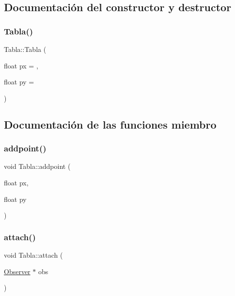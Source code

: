 \subsection{Documentación del constructor y destructor}
\mbox{\label{class_tabla_a30892e5df0e41e88871809298362bbc4}} 
\subsubsection{\texorpdfstring{Tabla()}{Tabla()}}
{\footnotesize\ttfamily Tabla\+::\+Tabla (\begin{DoxyParamCaption}\item[{float}]{px = {},  }\item[{float}]{py = {} }\end{DoxyParamCaption})\hspace{0.3cm}{\ttfamily [inline]}}



\subsection{Documentación de las funciones miembro}
\mbox{\label{class_tabla_a16815874f52762e6338c6cfa8b789663}} 
\subsubsection{\texorpdfstring{addpoint()}{addpoint()}}
{\footnotesize\ttfamily void Tabla\+::addpoint (\begin{DoxyParamCaption}\item[{float}]{px,  }\item[{float}]{py }\end{DoxyParamCaption})\hspace{0.3cm}{\ttfamily [inline]}}

\mbox{\label{class_tabla_a3cb029beafb4bfca9c9df9a955863792}} 
\subsubsection{\texorpdfstring{attach()}{attach()}}
{\footnotesize\ttfamily void Tabla\+::attach (\begin{DoxyParamCaption}\item[{\mbox{\hyperlink{class_observer}{Observer}} $\ast$}]{obs }\end{DoxyParamCaption})\hspace{0.3cm}{\ttfamily [inline]}}

